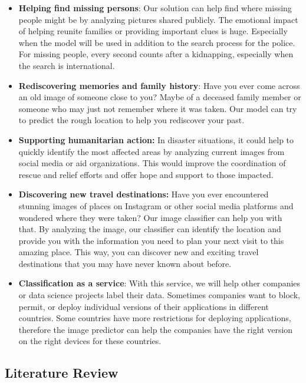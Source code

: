 \documentclass{article}
\providecommand{\tightlist}{%
  \setlength{\itemsep}{0pt}\setlength{\parskip}{0pt}}
\begin{document}
\begin{itemize}
\tightlist
\item
  \textbf{Helping find missing persons}: Our solution can help find
  where missing people might be by analyzing pictures shared publicly.
  The emotional impact of helping reunite families or providing
  important clues is huge. Especially when the model will be used in
  addition to the search process for the police. For missing people,
  every second counts after a kidnapping, especially when the search is
  international.
\item
  \textbf{Rediscovering memories and family history}: Have you ever come
  across an old image of someone close to you? Maybe of a deceased
  family member or someone who may just not remember where it was taken.
  Our model can try to predict the rough location to help you rediscover
  your past.
\item
  \textbf{Supporting humanitarian action:} In disaster situations, it
  could help to quickly identify the most affected areas by analyzing
  current images from social media or aid organizations. This would
  improve the coordination of rescue and relief efforts and offer hope
  and support to those impacted.
\item
  \textbf{Discovering new travel destinations:} Have you ever
  encountered stunning images of places on Instagram or other social
  media platforms and wondered where they were taken? Our image
  classifier can help you with that. By analyzing the image, our
  classifier can identify the location and provide you with the
  information you need to plan your next visit to this amazing place.
  This way, you can discover new and exciting travel destinations that
  you may have never known about before.
\item
  \textbf{Classification as a service}: With this service, we will help
  other companies or data science projects label their data. Sometimes
  companies want to block, permit, or deploy individual versions of
  their applications in different countries. Some countries have more
  restrictions for deploying applications, therefore the image predictor
  can help the companies have the right version on the right devices for
  these countries.
\end{itemize}

\subsection{Literature Review}\label{literature-review}
\end{document}
